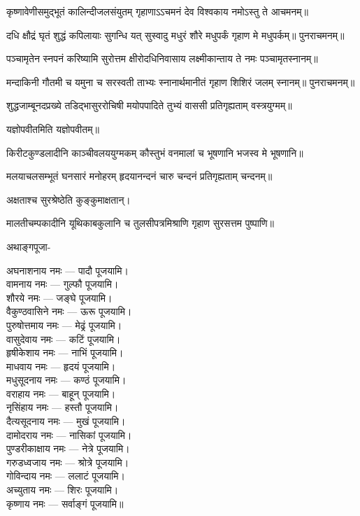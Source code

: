 \twolineshloka
{कृष्णावेणीसमुद्भूतं कालिन्दीजलसंयुतम्}
{गृहाणाऽऽचमनं देव विश्वकाय नमोऽस्तु ते}
आचमनम्॥

\twolineshloka
{दधि क्षौद्रं घृतं शुद्धं कपिलायाः सुगन्धि यत्}
{सुस्वादु मधुरं शौरे मधुपर्कं गृहाण मे}
मधुपर्कम्॥
पुनराचमनम्॥

\twolineshloka
{पञ्चामृतेन स्नपनं करिष्यामि सुरोत्तम}
{क्षीरोदधिनिवासाय लक्ष्मीकान्ताय ते नमः}
पञ्चामृतस्नानम्॥

\twolineshloka
{मन्दाकिनी गौतमी च यमुना च सरस्वती}
{ताभ्यः स्नानार्थमानीतं गृहाण शिशिरं जलम्}
स्नानम्॥
पुनराचमनम्॥

\twolineshloka
{शुद्धजाम्बूनदप्रख्ये तडिद्भासुररोचिषी}
{मयोपपादिते तुभ्यं वाससी प्रतिगृह्यताम्}
वस्त्रयुग्मम्॥

यज्ञोपवीतमिति यज्ञोपवीतम्॥

\twolineshloka
{किरीटकुण्डलादीनि काञ्चीवलययुग्मकम्}
{कौस्तुभं वनमालां च भूषणानि भजस्व मे}
भूषणानि॥

\twolineshloka
{मलयाचलसम्भूतं घनसारं मनोहरम्}
{हृदयानन्दनं चारु चन्दनं प्रतिगृह्यताम्}
चन्दनम्॥

अक्षताश्च सुरश्रेष्ठेति कुङ्कुमाक्षतान्।

\twolineshloka
{मालतीचम्पकादीनि यूथिकाबकुलानि च}
{तुलसीपत्रमिश्राणि गृहाण सुरसत्तम}
पुष्पाणि॥


अथाङ्गपूजा-

अघनाशनाय नमः — पादौ पूजयामि।\\
वामनाय नमः — गुल्फौ पूजयामि।\\
शौरये नमः — जङ्घे पूजयामि।\\
वैकुण्ठवासिने नमः — ऊरू पूजयामि।\\
पुरुषोत्तमाय नमः — मेढ्रं पूजयामि।\\
वासुदेवाय नमः — कटिं पूजयामि।\\
हृषीकेशाय नमः — नाभिं पूजयामि।\\
माधवाय नमः — हृदयं पूजयामि।\\
मधुसूदनाय नमः — कण्ठं पूजयामि।\\
वराहाय नमः — बाहून् पूजयामि।\\
नृसिंहाय नमः — हस्तौ पूजयामि।\\
दैत्यसूदनाय नमः — मुखं पूजयामि।\\
दामोदराय नमः — नासिकां पूजयामि।\\
पुण्डरीकाक्षाय नमः — नेत्रे पूजयामि।\\
गरुडध्वजाय नमः — श्रोत्रे पूजयामि।\\
गोविन्दाय नमः — ललाटं पूजयामि।\\
अच्युताय नमः — शिरः पूजयामि।\\
कृष्णाय नमः — सर्वाङ्गं पूजयामि॥\\


